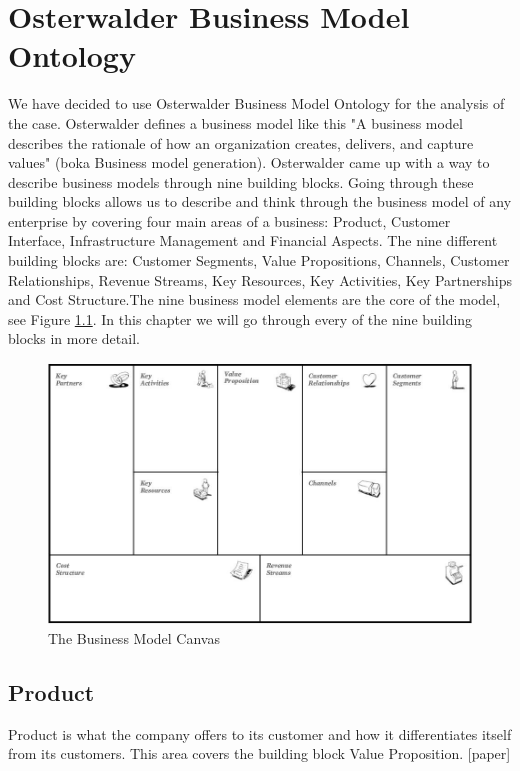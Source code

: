 \chapter{Osterwalder Business Model Ontology}
We have decided to use Osterwalder Business Model Ontology for the analysis of the case. Osterwalder defines a business model like this "A business model describes the rationale of how an organization creates, delivers, and capture values" (boka Business model generation). Osterwalder came up with a way to describe business models through nine building blocks. Going through these building blocks allows us to describe and think through the business model of any enterprise by covering four main areas of a business:  Product, Customer Interface, Infrastructure Management and Financial Aspects. The nine different building blocks are: Customer Segments, Value Propositions, Channels, Customer Relationships, Revenue Streams, Key Resources, Key Activities, Key Partnerships and Cost Structure.The nine business model elements are the core of the model, see Figure \ref{fig:TheBusinessModelCanvas}. In this chapter we will go through every of the nine building blocks in more detail.


\begin{figure}
\caption[The Business Model Canvas]{The Business Model Canvas \cite{osterwalder}}
\label{fig:TheBusinessModelCanvas}
\begin{center}
\includegraphics[scale=0.5]{business-model}
\end{center}
\end{figure}
\newpage
\section{Product}
Product is what the company offers to its customer and how it differentiates itself from its customers. This area covers the building block Value Proposition. [paper]
